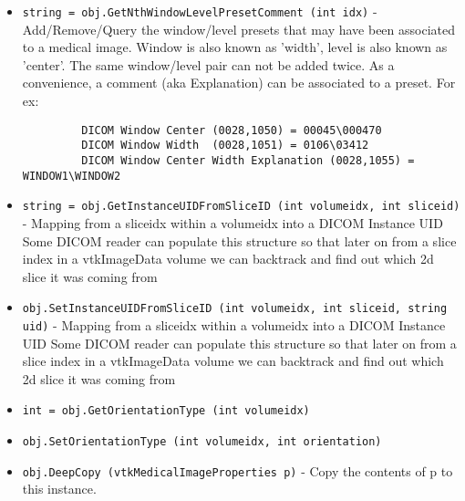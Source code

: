 \begin{itemize}
\item  \verb|string = obj.GetNthWindowLevelPresetComment (int idx)| -  Add/Remove/Query the window/level presets that may have been associated
 to a medical image. Window is also known as 'width', level is also known
 as 'center'. The same window/level pair can not be added twice.
 As a convenience, a comment (aka Explanation) can be associated to
 a preset.
 For ex:
 \begin{verbatim}
         DICOM Window Center (0028,1050) = 00045\000470
         DICOM Window Width  (0028,1051) = 0106\03412
         DICOM Window Center Width Explanation (0028,1055) = WINDOW1\WINDOW2
 \end{verbatim}

\item  \verb|string = obj.GetInstanceUIDFromSliceID (int volumeidx, int sliceid)| -  Mapping from a sliceidx within a volumeidx into a DICOM Instance UID
 Some DICOM reader can populate this structure so that later on from 
 a slice index in a vtkImageData volume we can backtrack and find out
 which 2d slice it was coming from

\item  \verb|obj.SetInstanceUIDFromSliceID (int volumeidx, int sliceid, string uid)| -  Mapping from a sliceidx within a volumeidx into a DICOM Instance UID
 Some DICOM reader can populate this structure so that later on from 
 a slice index in a vtkImageData volume we can backtrack and find out
 which 2d slice it was coming from

\item  \verb|int = obj.GetOrientationType (int volumeidx)|

\item  \verb|obj.SetOrientationType (int volumeidx, int orientation)|

\item  \verb|obj.DeepCopy (vtkMedicalImageProperties p)| -  Copy the contents of p to this instance.

\end{itemize}
